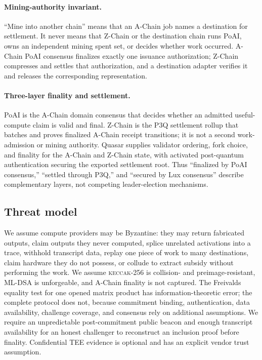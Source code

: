 \documentclass[11pt,a4paper]{article}
\begin{document}
\paragraph{Mining-authority invariant.} ``Mine into another chain'' means that an A-Chain job names a destination for settlement. It never means that Z-Chain or the destination chain runs PoAI, owns an independent mining spent set, or decides whether work occurred. A-Chain PoAI consensus finalizes exactly one issuance authorization; Z-Chain compresses and settles that authorization, and a destination adapter verifies it and releases the corresponding representation.

\paragraph{Three-layer finality and settlement.} PoAI is the A-Chain domain consensus that decides whether an admitted useful-compute claim is valid and final. Z-Chain is the P3Q settlement rollup that batches and proves finalized A-Chain receipt transitions; it is not a second work-admission or mining authority. Quasar supplies validator ordering, fork choice, and finality for the A-Chain and Z-Chain state, with activated post-quantum authentication securing the exported settlement root. Thus ``finalized by PoAI consensus,'' ``settled through P3Q,'' and ``secured by Lux consensus'' describe complementary layers, not competing leader-election mechanisms.

\subsection{Threat model}\label{sec:threat}

We assume compute providers may be Byzantine: they may return fabricated outputs, claim outputs they never computed, splice unrelated activations into a trace, withhold transcript data, replay one piece of work to many destinations, claim hardware they do not possess, or collude to extract subsidy without performing the work. We assume \textsc{keccak}-256 is collision- and preimage-resistant, ML-DSA is unforgeable, and A-Chain finality is not captured. The Freivalds equality test for one opened matrix product has information-theoretic error; the complete protocol does not, because commitment binding, authentication, data availability, challenge coverage, and consensus rely on additional assumptions. We require an unpredictable post-commitment public beacon and enough transcript availability for an honest challenger to reconstruct an inclusion proof before finality. Confidential TEE evidence is optional and has an explicit vendor trust assumption.
\end{document}
